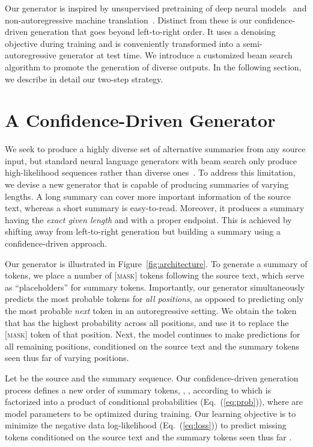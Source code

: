 \documentclass[11pt]{article}
\begin{document}
Our generator is inspired by unsupervised pretraining of deep neural models~\cite{peters-etal-2018-deep,radford2019language,devlin-etal-2019-bert,yan2020prophetnet,zhang2020pegasus,lewis-etal-2020-bart} and non-autoregressive machine translation~\cite{gu2018nonautoregressive,ghazvininejad-etal-2019-mask}.
Distinct from these is our confidence-driven generation that goes beyond left-to-right order.
It uses a denoising objective during training and is conveniently transformed into a semi-autoregressive generator at test time.
We introduce a customized beam search algorithm to promote the generation of diverse outputs.
In the following section, we describe in detail our two-step strategy.


\section{A Confidence-Driven Generator}
\label{sec:method}

We seek to produce a highly diverse set of alternative summaries from any source input, but standard neural language generators with beam search only produce high-likelihood sequences rather than diverse ones~\cite{ippolito-etal-2019-comparison}.
To address this limitation, we devise a new generator that is capable of producing summaries of varying lengths. 
A long summary can cover more important information of the source text, whereas a short summary is easy-to-read.
Moreover, it produces a summary having the \emph{exact given length} and with a proper endpoint.
This is achieved by shifting away from left-to-right generation but building a summary using a confidence-driven approach.
 

Our generator is illustrated in Figure~\ref{fig:architecture}.
To generate a summary of  tokens, we place a number of \textsc{[mask]} tokens following the source text, which serve as ``placeholders'' for summary tokens.
Importantly, our generator simultaneously predicts the most probable tokens for \emph{all positions}, as opposed to predicting only the most probable \emph{next} token in an autoregressive setting.
We obtain the token that has the highest probability across all positions, and use it to replace the \textsc{[mask]} token of that position.
Next, the model continues to make predictions for all remaining positions, conditioned on the source text and the summary tokens seen thus far of varying positions.


Let  be the source and  the summary sequence.
Our confidence-driven generation process defines a new order of summary tokens, , , 
according to which  is factorized into a product of conditional probabilities  (Eq.~(\ref{eq:prob})),
where  are model parameters to be optimized during training.
Our learning objective is to minimize the negative data log-likelihood (Eq.~(\ref{eq:loss})) to predict missing tokens  conditioned on the source text  and the summary tokens seen thus far .
 
\end{document}
